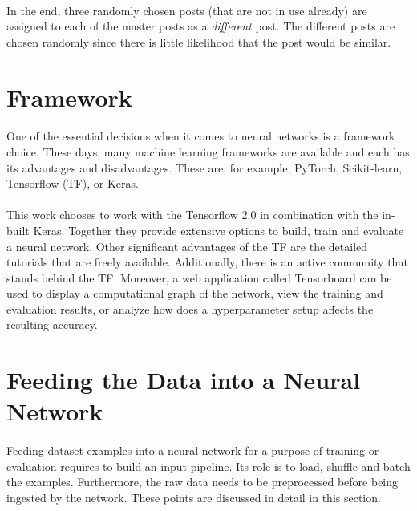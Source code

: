 \paragraph{}
In the end, three randomly chosen posts (that are not in use already) are assigned to each of the master posts as a \textit{different} post. The different posts are chosen randomly since there is little likelihood that the post would be similar.

\section{Framework}
\paragraph{}
One of the essential decisions when it comes to neural networks is a framework choice. These days, many machine learning frameworks are available and each has its advantages and disadvantages. These are, for example, PyTorch, Scikit-learn, Tensorflow (TF), or Keras.

\paragraph{}
This work chooses to work with the Tensorflow 2.0 in combination with the in-built Keras. Together they provide extensive options to build, train and evaluate a neural network. Other significant advantages of the TF are the detailed tutorials that are freely available. Additionally, there is an active community that stands behind the TF. Moreover, a web application called Tensorboard can be used to display a computational graph of the network, view the training and evaluation results, or analyze how does a hyperparameter setup affects the resulting accuracy.

\section{Feeding the Data into a Neural Network}
\paragraph{}
Feeding dataset examples into a neural network for a purpose of training or evaluation requires to build an input pipeline. Its role is to load, shuffle and batch the examples. Furthermore, the raw data needs to be preprocessed before being ingested by the network. These points are discussed in detail in this section. 

